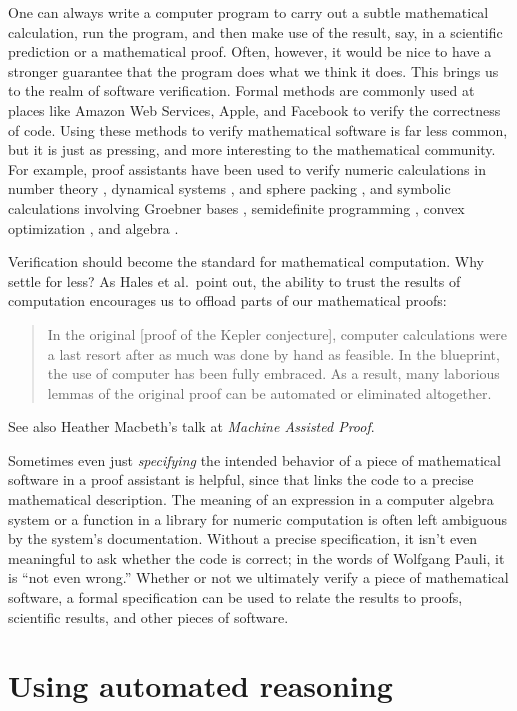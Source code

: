 \documentclass{amsart}
\theoremstyle{definition}
\theoremstyle{remark}
\numberwithin{equation}{section}
\begin{document}
One can always write a computer program to carry out a subtle mathematical calculation, run the program, and then make use of the result, say, in a scientific prediction or a mathematical proof. Often, however, it would be nice to have a stronger guarantee that the program does what we think it does. This brings us to the realm of software verification. Formal methods are commonly used at places like Amazon Web Services, Apple, and Facebook to verify the correctness of code. Using these methods to verify mathematical software is far less common, but it is just as pressing, and more interesting to the mathematical community. For example, proof assistants have been used to verify numeric calculations in number theory \cite{mahboubi:et:al:19}, dynamical systems \cite{immler:18}, and sphere packing \cite{hales:et:al:17}, and symbolic calculations involving Groebner bases \cite{pottier:08}, semidefinite programming \cite{harrison:07}, convex optimization \cite{bentkamp:mir:avigad:23}, and algebra \cite{mahboubi:sibut:pinote:21}.

Verification should become the standard for mathematical computation. Why settle for less? As Hales et al.~point out, the ability to trust the results of computation encourages us to offload parts of our mathematical proofs:
\begin{quote}
In the original [proof of the Kepler conjecture], computer calculations were a last resort after as much was
done by hand as feasible. In the blueprint, the use of computer has been
fully embraced. As a result, many laborious lemmas of the original proof
can be automated or eliminated altogether. \cite[Section 4.3]{hales:et:al:17}
\end{quote}
See also Heather Macbeth's talk at \emph{Machine Assisted Proof}.

Sometimes even just \emph{specifying} the intended behavior of a piece of mathematical software in a proof assistant is helpful, since that links the code to a precise mathematical description. The meaning of an expression in a computer algebra system or a function in a library for numeric computation is often left ambiguous by the system's documentation. Without a precise specification, it isn't even meaningful to ask whether the code is correct; in the words of Wolfgang Pauli, it is ``not even wrong.'' Whether or not we ultimately verify a piece of mathematical software, a formal specification can be used to relate the results to proofs, scientific results, and other pieces of software.


\section{Using automated reasoning}
\label{section:enabling:automated:reasoning}
\end{document}
